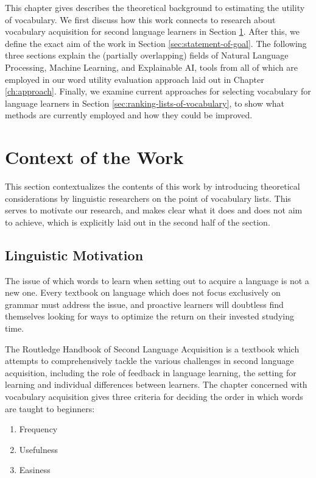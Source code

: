 This chapter gives describes the theoretical background to estimating the utility of vocabulary.
We first discuss how this work connects to research about vocabulary acquisition for second language learners in Section \ref{sec:context-of-work}.
After this, we define the exact aim of the work in Section \ref{sec:statement-of-goal}.
The following three sections explain the (partially overlapping) fields of Natural Language Processing, Machine Learning, and Explainable AI, tools from all of which are employed in our word utility evaluation approach laid out in Chapter \ref{ch:approach}.
Finally, we examine current approaches for selecting vocabulary for language learners in Section \ref{sec:ranking-lists-of-vocabulary}, to show what methods are currently employed and how they could be improved.


\section{Context of the Work} \label{sec:context-of-work}

This section contextualizes the contents of this work by introducing theoretical considerations by linguistic researchers on the point of vocabulary lists.
This serves to motivate our research, and makes clear what it does and does not aim to achieve, which is explicitly laid out in the second half of the section.


\subsection{Linguistic Motivation} \label{sec:linguistic-motivation}
The issue of which words to learn when setting out to acquire a language is not a new one.
Every textbook on language which does not focus exclusively on grammar must address the issue, and proactive learners will doubtless find themselves looking for ways to optimize the return on their invested studying time.

The Routledge Handbook of Second Language Acquisition \cite{liRoutledgeHandbookSecond2022} is a textbook which attempts to comprehensively tackle the various challenges in second language acquisition, including the role of feedback in language learning, the setting for learning and individual differences between learners.
The chapter concerned with vocabulary acquisition gives three criteria for deciding the order in which words are taught to beginners:

\begin{enumerate}
	\item Frequency
	\item Usefulness
	\item Easiness
\end{enumerate}

